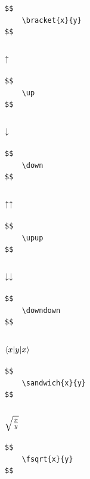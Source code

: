 \documentclass[a4paper]{article}
\begin{document}
\begin{verbatim}
$$
	\bracket{x}{y}
$$
\end{verbatim}

\subsubsection{$ \uparrow$}

\begin{verbatim}
$$
	\up
$$
\end{verbatim}

\subsubsection{$ \downarrow$}

\begin{verbatim}
$$
	\down
$$
\end{verbatim}

\subsubsection{$ \uparrow \uparrow$}

\begin{verbatim}
$$
	\upup
$$
\end{verbatim}

\subsubsection{$ \downarrow \downarrow$}

\begin{verbatim}
$$
	\downdown
$$
\end{verbatim}

\subsubsection{$  \langle x| y  |x\rangle$}

\begin{verbatim}
$$
	\sandwich{x}{y}
$$
\end{verbatim}

\subsubsection{$ \sqrt{\frac{x}{y}}$}

\begin{verbatim}
$$
	\fsqrt{x}{y}
$$
\end{verbatim}
\end{document}
